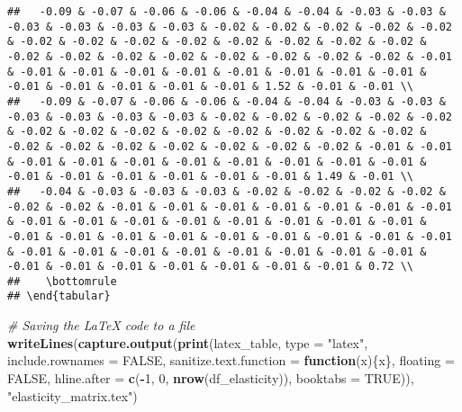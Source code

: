 \documentclass[
]{article}
\newenvironment{Shaded}{\begin{snugshade}}{\end{snugshade}}
\newcommand{\AttributeTok}[1]{\textcolor[rgb]{0.13,0.29,0.53}{#1}}
\newcommand{\CommentTok}[1]{\textcolor[rgb]{0.56,0.35,0.01}{\textit{#1}}}
\newcommand{\ConstantTok}[1]{\textcolor[rgb]{0.56,0.35,0.01}{#1}}
\newcommand{\ControlFlowTok}[1]{\textcolor[rgb]{0.13,0.29,0.53}{\textbf{#1}}}
\newcommand{\DecValTok}[1]{\textcolor[rgb]{0.00,0.00,0.81}{#1}}
\newcommand{\FunctionTok}[1]{\textcolor[rgb]{0.13,0.29,0.53}{\textbf{#1}}}
\newcommand{\NormalTok}[1]{#1}
\newcommand{\SpecialCharTok}[1]{\textcolor[rgb]{0.81,0.36,0.00}{\textbf{#1}}}
\newcommand{\StringTok}[1]{\textcolor[rgb]{0.31,0.60,0.02}{#1}}
\begin{document}
\begin{verbatim}
##   -0.09 & -0.07 & -0.06 & -0.06 & -0.04 & -0.04 & -0.03 & -0.03 & -0.03 & -0.03 & -0.03 & -0.03 & -0.02 & -0.02 & -0.02 & -0.02 & -0.02 & -0.02 & -0.02 & -0.02 & -0.02 & -0.02 & -0.02 & -0.02 & -0.02 & -0.02 & -0.02 & -0.02 & -0.02 & -0.02 & -0.02 & -0.02 & -0.02 & -0.01 & -0.01 & -0.01 & -0.01 & -0.01 & -0.01 & -0.01 & -0.01 & -0.01 & -0.01 & -0.01 & -0.01 & -0.01 & -0.01 & 1.52 & -0.01 & -0.01 \\ 
##   -0.09 & -0.07 & -0.06 & -0.06 & -0.04 & -0.04 & -0.03 & -0.03 & -0.03 & -0.03 & -0.03 & -0.03 & -0.02 & -0.02 & -0.02 & -0.02 & -0.02 & -0.02 & -0.02 & -0.02 & -0.02 & -0.02 & -0.02 & -0.02 & -0.02 & -0.02 & -0.02 & -0.02 & -0.02 & -0.02 & -0.02 & -0.02 & -0.01 & -0.01 & -0.01 & -0.01 & -0.01 & -0.01 & -0.01 & -0.01 & -0.01 & -0.01 & -0.01 & -0.01 & -0.01 & -0.01 & -0.01 & -0.01 & 1.49 & -0.01 \\ 
##   -0.04 & -0.03 & -0.03 & -0.03 & -0.02 & -0.02 & -0.02 & -0.02 & -0.02 & -0.02 & -0.01 & -0.01 & -0.01 & -0.01 & -0.01 & -0.01 & -0.01 & -0.01 & -0.01 & -0.01 & -0.01 & -0.01 & -0.01 & -0.01 & -0.01 & -0.01 & -0.01 & -0.01 & -0.01 & -0.01 & -0.01 & -0.01 & -0.01 & -0.01 & -0.01 & -0.01 & -0.01 & -0.01 & -0.01 & -0.01 & -0.01 & -0.01 & -0.01 & -0.01 & -0.01 & -0.01 & -0.01 & -0.01 & -0.01 & 0.72 \\ 
##    \bottomrule
## \end{tabular}
\end{verbatim}

\begin{Shaded}
\begin{Highlighting}[]
\CommentTok{\# Saving the LaTeX code to a file}
\FunctionTok{writeLines}\NormalTok{(}\FunctionTok{capture.output}\NormalTok{(}\FunctionTok{print}\NormalTok{(latex\_table, }\AttributeTok{type =} \StringTok{"latex"}\NormalTok{, }\AttributeTok{include.rownames =} \ConstantTok{FALSE}\NormalTok{, }
                                \AttributeTok{sanitize.text.function =} \ControlFlowTok{function}\NormalTok{(x)\{x\},}
                                \AttributeTok{floating =} \ConstantTok{FALSE}\NormalTok{,}
                                \AttributeTok{hline.after =} \FunctionTok{c}\NormalTok{(}\SpecialCharTok{{-}}\DecValTok{1}\NormalTok{, }\DecValTok{0}\NormalTok{, }\FunctionTok{nrow}\NormalTok{(df\_elasticity)),}
                                \AttributeTok{booktabs =} \ConstantTok{TRUE}\NormalTok{)),}
           \StringTok{"elasticity\_matrix.tex"}\NormalTok{)}
\end{Highlighting}
\end{Shaded}
\end{document}
